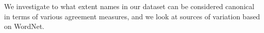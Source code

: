 %

We investigate to what extent names in our dataset can be considered canonical in terms of various agreement measures,
and we look at sources of variation based on WordNet. %

